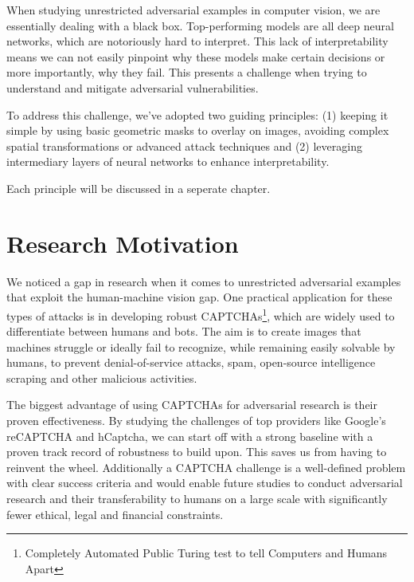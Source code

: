 \documentclass[a4paper, oneside]{discothesis}
\begin{document}
When studying unrestricted adversarial examples in computer vision, we are essentially dealing with a black box. Top-performing models are all deep neural networks, which are notoriously hard to interpret. This lack of interpretability means we can not easily pinpoint why these models make certain decisions or more importantly, why they fail. This presents a challenge when trying to understand and mitigate adversarial vulnerabilities.

To address this challenge, we've adopted two guiding principles: (1) keeping it simple by using basic geometric masks to overlay on images, avoiding complex spatial transformations or advanced attack techniques and (2) leveraging intermediary layers of neural networks to enhance interpretability.

Each principle will be discussed in a seperate chapter.

\section{Research Motivation}

We noticed a gap in research when it comes to unrestricted adversarial examples that exploit the human-machine vision gap. One practical application for these types of attacks is in developing robust CAPTCHAs\footnote{Completely Automated Public Turing test to tell Computers and Humans Apart}, which are widely used to differentiate between humans and bots. The aim is to create images that machines struggle or ideally fail to recognize, while remaining easily solvable by humans, to prevent denial-of-service attacks, spam, open-source intelligence scraping and other malicious activities.

The biggest advantage of using CAPTCHAs for adversarial research is their proven effectiveness. By studying the challenges of top providers like Google's reCAPTCHA and hCaptcha, we can start off with a strong baseline \textendash{} with a proven track record of robustness \textendash{} to build upon. This saves us from having to reinvent the wheel. Additionally a CAPTCHA challenge is a well-defined problem with clear success criteria and would enable future studies to conduct adversarial research and their transferability to humans on a large scale with significantly fewer ethical, legal and financial constraints.
\end{document}
